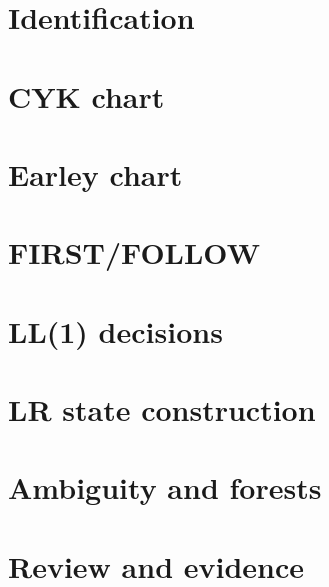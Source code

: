 \documentclass[11pt,letterpaper]{article}
\begin{document}
\makedoctitle\makedocsummary
\section{Identification}
\section{CYK chart}
\section{Earley chart}
\section{FIRST/FOLLOW}
\section{LL(1) decisions}
\section{LR state construction}
\section{Ambiguity and forests}
\section{Review and evidence}
\end{document}

